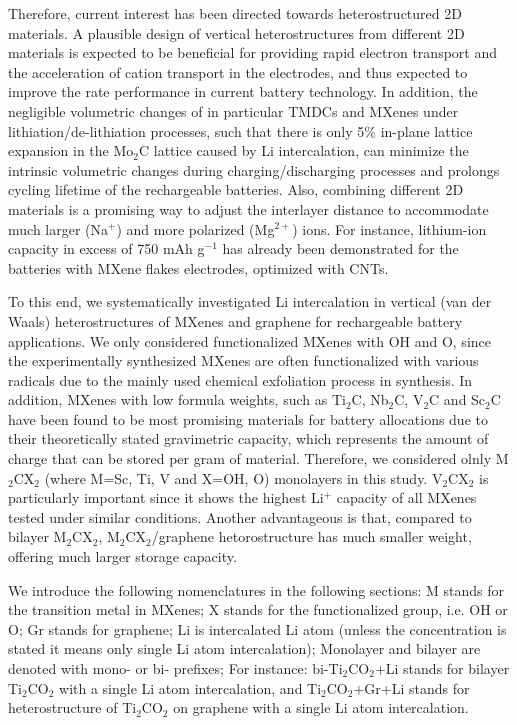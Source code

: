 Therefore, current interest has been directed towards heterostructured\cite{C5CS00937E,Pomerantseva_Gogotsi_2017} 2D materials. A plausible design of vertical heterostructures from different 2D materials is expected to be beneficial for providing rapid electron transport and the acceleration of cation transport in the electrodes, and thus expected to improve the rate performance in current battery technology\cite{Pomerantseva_Gogotsi_2017}. In addition, the negligible volumetric changes of in particular TMDCs and MXenes under lithiation/de-lithiation processes, such that there is only 5\% in-plane lattice expansion in the Mo$_2$C lattice caused by Li intercalation\cite{C6TA01918H}, can minimize the intrinsic volumetric changes during charging/discharging processes and prolongs cycling lifetime of the rechargeable batteries. Also, combining different 2D materials is a promising way to adjust the interlayer distance to accommodate much larger (Na$^{+}$) and more polarized (Mg$^{2+}$) ions. For instance, lithium-ion capacity in excess of 750 mAh g$^{-1}$\cite{CELC:CELC201600059} has already been demonstrated for the batteries with MXene flakes electrodes, optimized with CNTs.

To this end, we systematically investigated Li intercalation in vertical (van der Waals) heterostructures of MXenes and graphene for rechargeable battery applications. We only considered functionalized MXenes with  OH and O, since the experimentally synthesized MXenes are often functionalized with various radicals due to the mainly used chemical exfoliation process in synthesis. In addition, MXenes with low formula weights, such as Ti$_2$C, Nb$_2$C, V$_2$C and Sc$_2$C have been found to be most promising\cite{doi:10.1021/ja405735d} materials for battery allocations due to their theoretically stated gravimetric capacity, which represents the amount of charge that can be stored per gram of material. Therefore, we considered olnly M$_2$CX$_2$ (where M=Sc, Ti, V and X=OH, O) monolayers in this study. V$_2$CX$_2$ is particularly important since it shows the highest Li$^+$ capacity of all MXenes tested under similar conditions\cite{doi:10.1021/ja508154e}. Another advantageous is that, compared to bilayer M$_2$CX$_2$, M$_2$CX$_2$/graphene hetorostructure has much smaller weight, offering much larger storage capacity. 

We introduce the following nomenclatures in the following sections: M stands for the transition metal in MXenes; X stands for the functionalized group, i.e. OH or O; Gr stands for graphene; Li is intercalated Li atom (unless the concentration is stated it means only single Li atom intercalation); Monolayer and bilayer are denoted with mono- or bi- prefixes; For instance: bi-Ti$_2$CO$_2$+Li stands for bilayer Ti$_2$CO$_2$ with a single Li atom intercalation, and Ti$_2$CO$_2$+Gr+Li stands for heterostructure of Ti$_2$CO$_2$ on graphene with a single Li atom intercalation. 

